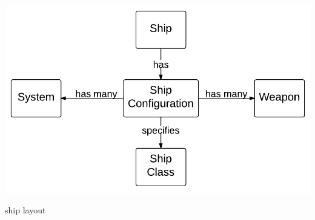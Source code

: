 \begin{marginfigure}
	\includegraphics{res/model/ship.pdf}
	\caption{ship layout}
	\label{fig:model:shipRelation}
\end{marginfigure}





 


% 